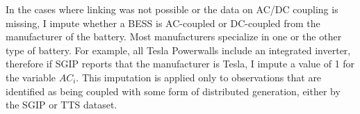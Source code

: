 In the cases where linking was not possible or the data on AC/DC coupling is missing, I impute whether a BESS is AC-coupled or DC-coupled from the manufacturer of the battery. Most manufacturers specialize in one or the other type of battery. For example, all Tesla Powerwalls include an integrated inverter, therefore if SGIP reports that the manufacturer is Tesla, I impute a value of 1 for the variable $AC_i$. This imputation is applied only to observations that are identified as being coupled with some form of distributed generation, either by the SGIP or TTS dataset.